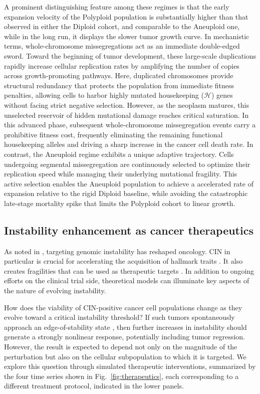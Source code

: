 \documentclass[10pt, aps, rmp,  twocolumn, superscriptaddress, floatfix, showkeys]{revtex4-2}
\begin{document}
A prominent distinguishing feature among these regimes is that the early expansion velocity of the Polyploid population is substantially higher than that observed in either the Diploid cohort, and comparable to the Aneuploid one, while in the long run, it displays the slower tumor growth curve. In mechanistic terms, whole-chromosome missegregations act as an immediate double-edged sword. Toward the beginning of tumor development, these large-scale duplications rapidly increase cellular replication rates by amplifying the number of copies across growth-promoting pathways. Here, duplicated chromosomes provide structural redundancy that protects the population from immediate fitness penalties, allowing cells to harbor highly mutated housekeeping ($\mathcal{H}$) genes without facing strict negative selection. However, as the neoplasm matures, this unselected reservoir of hidden mutational damage reaches critical saturation. In this advanced phase, subsequent whole-chromosome missegregation events carry a prohibitive fitness cost, frequently eliminating the remaining functional housekeeping alleles and driving a sharp increase in the cancer cell death rate.  
In contrast, the Aneuploid regime exhibits a unique adaptive trajectory. Cells undergoing segmental missegregation are continuously selected to optimize their replication speed while managing their underlying mutational fragility. This active selection enables the Aneuploid population to achieve a accelerated rate of expansion relative to the rigid Diploid baseline, while avoiding the catastrophic late-stage mortality spike that limits the Polyploid cohort to linear growth.  





\subsection*{Instability enhancement as cancer therapeutics}


As noted in \citet{yap2026targeting}, targeting genomic instability 
has reshaped oncology. CIN in particular is crucial for accelerating 
the acquisition of hallmark traits \cite{janssen2013genetic,huang2013genetic}. It also creates fragilities that 
can be used as therapeutic targets \cite{martin2010genomic,hussain2025genomic}. In addition to ongoing efforts 
on the clinical trial side, theoretical models can illuminate key 
aspects of the nature of evolving instability. 


How does the viability of CIN-positive cancer cell populations 
change as they evolve toward a critical instability threshold? If
such tumors spontaneously approach an edge-of-stability state 
\cite{Amor2014-jv,sole2014can,andor2017genomic}, then 
further increases in instability should generate a strongly 
nonlinear response, potentially including tumor regression. However, 
the result is expected to depend not only on the magnitude of the 
perturbation but also on the cellular subpopulation to which it is 
targeted. We explore this question through simulated therapeutic 
interventions, summarized by the four time series shown in 
Fig.~\ref{fig:therapeutics}, each corresponding to a different 
treatment protocol, indicated in the lower panels.
\end{document}
